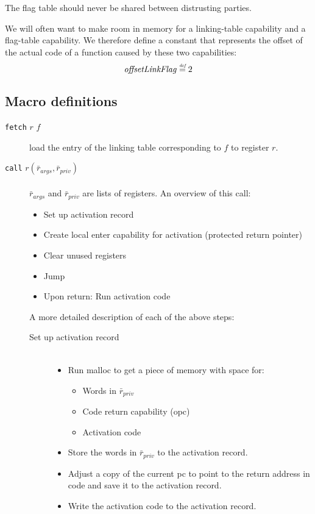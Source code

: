 \documentclass[a4paper]{article}
\newcommand{\forcenewline}{$\phantom{v}$\\}
\newcommand{\defeq}{\stackrel{\textit{\tiny{def}}}{=}}
\newcommand{\var}[1]{\mathit{#1}}
\newcommand{\olf}{\var{offsetLinkFlag}}
\begin{document}
The flag table should never be shared between distrusting parties.

We will often want to make room in memory for a linking-table capability and a flag-table capability. We therefore define a constant that represents the offset of the actual code of a function caused by these two capabilities:
\[
  \olf \defeq 2
\]

\subsection{Macro definitions}
\begin{description}
\item[\texttt{fetch} $r$ $f$] load the entry of the linking table corresponding to $f$ to register $r$.
\item[\texttt{call} $r(\bar{r}_{\var{args}},\bar{r}_{\var{priv}})$] \forcenewline
  $\bar{r}_{\var{args}}$ and $\bar{r}_{\var{priv}}$ are lists of registers. An overview of this call:
  \begin{itemize}
  \item Set up activation record
  \item Create local enter capability for activation (protected return pointer)
  \item Clear unused registers
  \item Jump
  \item Upon return: Run activation code
  \end{itemize}
  A more detailed description of each of the above steps:
  \begin{description}
  \item [Set up activation record]\forcenewline
    \begin{itemize}
    \item Run malloc to get a piece of memory with space for:
      \begin{itemize}
      \item Words in $\bar{r}_{\var{priv}}$
      \item Code return capability (opc)
      \item Activation code
      \end{itemize}
    \item Store the words in $\bar{r}_{\var{priv}}$ to the activation record. 
    \item Adjust a copy of the current pc to point to the return address in code and save it to the activation record.
    \item Write the activation code to the activation record.

\end{itemize}
\end{description}
\end{description}
\end{document}
